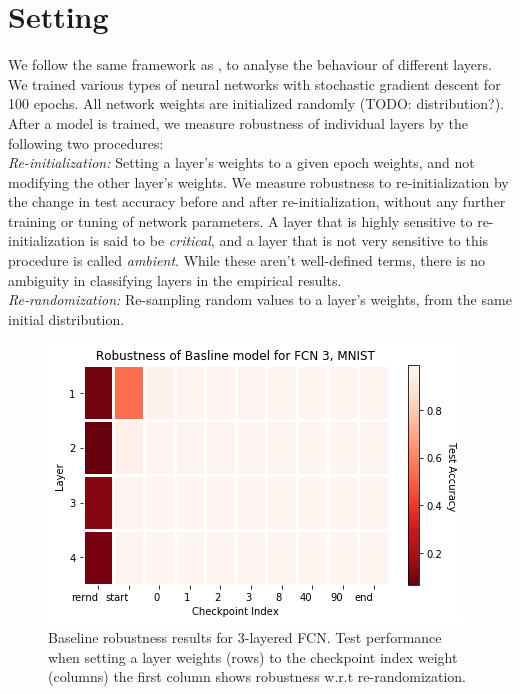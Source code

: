 \documentclass{article}
\begin{document}
\section{Setting}
We follow the same framework as \cite{allLayers}, to analyse the behaviour of different layers. We trained various types of neural networks with stochastic gradient descent for 100 epochs. All network weights are initialized randomly (TODO: distribution?). After a model is trained, we measure robustness of individual layers by the following two procedures:\\
\emph{Re-initialization:} Setting a layer's weights to a given epoch weights, and not modifying the other layer's weights. We measure robustness to re-initialization by the change in test accuracy before and after re-initialization, without any further training or tuning of network parameters. A layer that is highly sensitive to re-initialization is said to be \emph{critical}, and a layer that is not very sensitive to this procedure is called \emph{ambient}. While these aren't well-defined terms, there is no ambiguity in classifying layers in the empirical results. \\
\emph{Re-randomization:} Re-sampling random values to a layer's weights, from the same initial distribution. \\
\begin{figure}
  \includegraphics[width=\linewidth]{images/baseline_fc3_mnist_heatmap.png}
  \caption{Baseline robustness results for 3-layered FCN. Test performance when setting a layer weights (rows) to the checkpoint index weight (columns) the first column shows robustness w.r.t re-randomization.}
  \label{fig:baseline_fc3_heatmap}
\end{figure}
\end{document}
